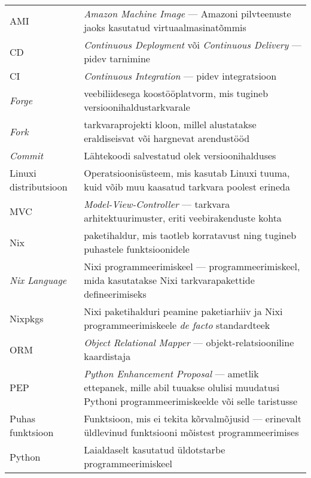 \begin{longtable}{p{4cm}p{10cm}}
AMI&\textit{Amazon Machine Image} — Amazoni pilvteenuste jaoks kasutatud virtuaalmasinatõmmis\\
CD&\textit{Continuous Deployment} või \textit{Continuous Delivery} — pidev tarnimine\\
CI&\textit{Continuous Integration} — pidev integratsioon\\
\textit{Forge}&veebiliidesega koostööplatvorm, mis tugineb versioonihaldustarkvarale\\
\textit{Fork}&tarkvaraprojekti kloon, millel alustatakse eraldiseisvat või hargnevat arendustööd\\
\textit{Commit}&Lähtekoodi salvestatud olek versioonihalduses\\
Linuxi distributsioon&Operatsioonisüsteem, mis kasutab Linuxi tuuma, kuid võib muu kaasatud tarkvara poolest erineda\\
MVC&\textit{Model-View-Controller} — tarkvara arhitektuurimuster, eriti veebirakenduste kohta\\
Nix&paketihaldur, mis taotleb korratavust ning tugineb puhastele funktsioonidele\\
\textit{Nix Language}& Nixi programmeerimiskeel — programmeerimiskeel, mida kasutatakse Nixi tarkvarapakettide defineerimiseks\\
Nixpkgs&Nixi paketihalduri peamine paketiarhiiv ja Nixi programmeerimiskeele \textit{de facto} standardteek\\
ORM&\emph{Object Relational Mapper} — objekt-relatsiooniline kaardistaja\\
PEP&\textit{Python Enhancement Proposal} — ametlik ettepanek, mille abil tuuakse olulisi muudatusi Pythoni programmeerimiskeelde või selle taristusse\\
Puhas funktsioon&Funktsioon, mis ei tekita kõrvalmõjusid — erinevalt üldlevinud funktsiooni mõistest programmeerimises\\
Python&Laialdaselt kasutatud üldotstarbe programmeerimiskeel\\
\end{longtable}
\addtocounter{table}{-1} 

